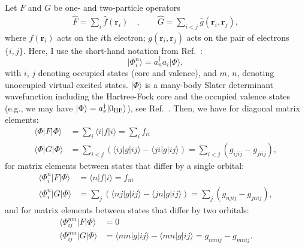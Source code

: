 \documentclass[10pt,twocolumn,a4paper]{article}%
\newcommand{\bra}[1]{\ensuremath{\langle #1|}}	%
\newcommand{\ket}[1]{\ensuremath{|#1\rangle}}	%
\renewcommand{\v}[1]{\ensuremath{\boldsymbol{#1}}}		%
\begin{document}
Let $F$ and $G$ be one- and two-particle operators
\begin{align}
\hat F = \sum_i \hat f(\v{r}_i) \quad,\qquad
\hat G = \sum_{i<j} \hat g(\v{r}_i,\v{r}_j),
\end{align}
where $f(\v{r}_i)$ acts on the $i$th electron; $g(\v{r}_i,\v{r}_j)$ acts on the pair of electrons $\{i,j\}$.
Here, I use the short-hand notation from Ref.~\cite{Lindgren1986}:
\[
\ket{\Phi_i^n} = a_n^\dag a_i \ket{\Phi},
\]
with $i$, $j$ denoting occupied states (core and valence), and $m$, $n$, denoting unoccupied virtual excited states.
$\ket{\Phi}$ is a many-body Slater determinant wavefunction including the Hartree-Fock core and the occupied valence states (e.g., we may have $\ket{\Phi} = a_v^\dag\ket{0_{\rm HF}}$), see Ref.~\cite{Lindgren1986}.
Then, we have for diagonal matrix elements:
\begin{equation}\begin{split}
\bra{\Phi}F\ket{\Phi} &= \sum_i \bra{i}f\ket{i}  = \sum_i f_{ii}\\
\bra{\Phi}G\ket{\Phi} &= \sum_{i<j} \left( \bra{ij}g\ket{ij} - \bra{ji}g\ket{ij} \right) = \sum_{i<j} (g_{ijij}-g_{jiij}),
\end{split}\end{equation}
for matrix elements between states that differ by a single orbital:
\begin{equation}\begin{split}
\bra{\Phi^n_i}F\ket{\Phi} &=  \bra{n}f\ket{i}  = f_{ni}\\
\bra{\Phi^n_i}G\ket{\Phi} &= \sum_{j} \left( \bra{nj}g\ket{ij} - \bra{jn}g\ket{ij} \right)  = \sum_{j} (g_{njij}-g_{jnij}) ,
\end{split}\end{equation}
and for matrix elements between states that differ by two orbitals:
\begin{equation}\begin{split}\label{eq:G-twobody}
\bra{\Phi^{nm}_{ij}}F\ket{\Phi} &=  0 \\
\bra{\Phi^{nm}_{ij}}G\ket{\Phi} &= \bra{nm}g\ket{ij} - \bra{mn}g\ket{ij} = g_{nmij}-g_{mnij}.
\end{split}\end{equation}


\end{document}
